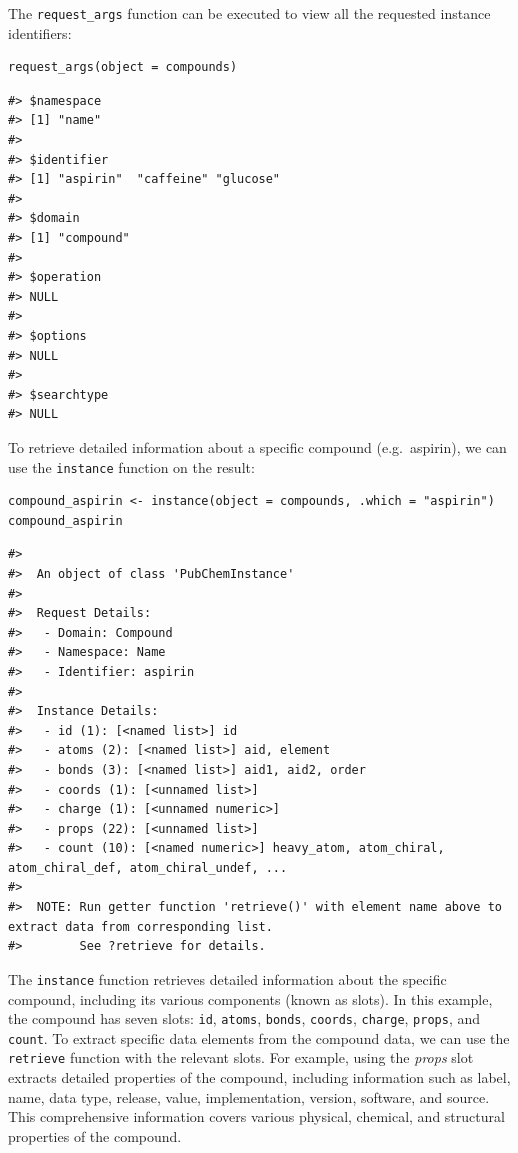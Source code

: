 The \texttt{request\_args} function can be executed to view all the requested instance identifiers:

\begin{verbatim}
request_args(object = compounds)
\end{verbatim}

\begin{verbatim}
#> $namespace
#> [1] "name"
#> 
#> $identifier
#> [1] "aspirin"  "caffeine" "glucose" 
#> 
#> $domain
#> [1] "compound"
#> 
#> $operation
#> NULL
#> 
#> $options
#> NULL
#> 
#> $searchtype
#> NULL
\end{verbatim}

To retrieve detailed information about a specific compound (e.g.~aspirin), we can use the \texttt{instance} function on the result:

\begin{verbatim}
compound_aspirin <- instance(object = compounds, .which = "aspirin")
compound_aspirin
\end{verbatim}

\begin{verbatim}
#> 
#>  An object of class 'PubChemInstance'
#> 
#>  Request Details:  
#>   - Domain: Compound
#>   - Namespace: Name
#>   - Identifier: aspirin
#> 
#>  Instance Details:  
#>   - id (1): [<named list>] id
#>   - atoms (2): [<named list>] aid, element
#>   - bonds (3): [<named list>] aid1, aid2, order
#>   - coords (1): [<unnamed list>] 
#>   - charge (1): [<unnamed numeric>] 
#>   - props (22): [<unnamed list>] 
#>   - count (10): [<named numeric>] heavy_atom, atom_chiral, atom_chiral_def, atom_chiral_undef, ...
#> 
#>  NOTE: Run getter function 'retrieve()' with element name above to extract data from corresponding list. 
#>        See ?retrieve for details.
\end{verbatim}

The \texttt{instance} function retrieves detailed information about the specific compound, including its various components (known as slots). In this example, the compound has seven slots: \texttt{id}, \texttt{atoms}, \texttt{bonds}, \texttt{coords}, \texttt{charge}, \texttt{props}, and \texttt{count}. To extract specific data elements from the compound data, we can use the \texttt{retrieve} function with the relevant slots. For example, using the \emph{props} slot extracts detailed properties of the compound, including information such as label, name, data type, release, value, implementation, version, software, and source. This comprehensive information covers various physical, chemical, and structural properties of the compound.

